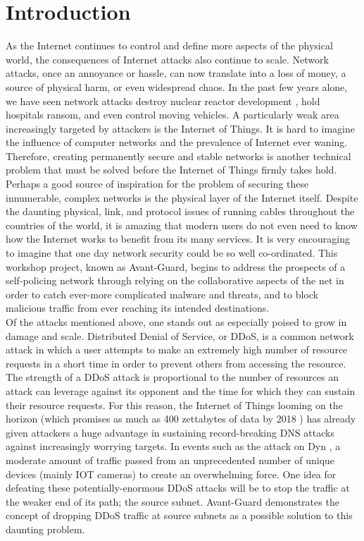 \section{Introduction}
\label{sec:intro}

As the Internet continues to control and define more aspects of the physical world, the consequences of Internet attacks also continue to scale. Network attacks, once an annoyance or hassle, can now translate into a loss of money, a source of physical harm, or even widespread chaos. In the past few years alone, we have seen network attacks destroy nuclear reactor development \cite{stux}, hold hospitals ransom\cite{ransom}, and even control moving vehicles\cite{carhack}. A particularly weak area increasingly targeted by attackers is the Internet of Things. It is hard to imagine the influence of computer networks and the prevalence of Internet ever waning. Therefore, creating permanently secure and stable networks is another technical problem that must be solved before the Internet of Things firmly takes hold. \\

Perhaps a good source of inspiration for the problem of securing these innumerable, complex networks is the physical layer of the Internet itself. Despite the daunting physical, link, and protocol issues of running cables throughout the countries of the world, it is amazing that modern users do not even need to know how the Internet works to benefit from its many services. It is very encouraging to imagine that one day network security could be so well co-ordinated. This workshop project, known as Avant-Guard, begins to address the prospects of a self-policing network through relying on the collaborative aspects of the net in order to catch ever-more complicated malware and threats, and to block malicious traffic from ever reaching its intended destinations. \\

Of the attacks mentioned above, one stands out as especially poised to grow in damage and scale. Distributed Denial of Service, or DDoS, is a common network attack in which a user attempts to make an extremely high number of resource requests in a short time in order to prevent others from accessing the resource. The strength of a DDoS attack is proportional to the number of resources an attack can leverage against its opponent and the time for which they can sustain their resource requests. For this reason, the Internet of Things looming on the horizon (which promises as much as 400 zettabytes of data by 2018 \cite{zetta}) has already given attackers a huge advantage in sustaining record-breaking DNS attacks against increasingly worrying targets. In events such as the attack on Dyn \cite{dyn}, a moderate amount of traffic passed from an unprecedented number of unique devices (mainly IOT cameras) to create an overwhelming force. One idea for defeating these potentially-enormous DDoS attacks will be to stop the traffic at the weaker end of its path; the source subnet. Avant-Guard demonstrates the concept of dropping DDoS traffic at source subnets as a possible solution to this daunting problem.